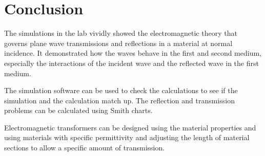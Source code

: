 \section{Conclusion}\label{sec:conclusion}
The simulations in the lab vividly showed the electromagnetic theory that governs plane wave transmissions and reflections in a material at normal incidence.
It demonstrated how the waves behave in the first and second medium, especially the interactions of the incident wave and the reflected wave in the first medium. 

The simulation software can be used to check the calculations to see if the simulation and the calculation match up.
The reflection and transmission problems can be calculated using Smith charts. 

Electromagnetic transformers can be designed using the material properties and using materials with specific permittivity and adjusting the length of material sections to allow a specific amount of transmission. 
